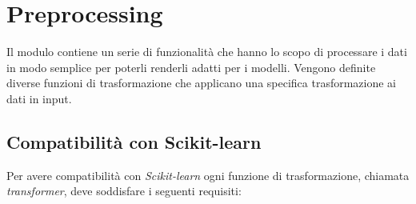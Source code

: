 \section{Preprocessing}
Il modulo contiene un serie di funzionalità che hanno lo scopo di processare i dati in modo semplice per poterli renderli adatti per i modelli. Vengono definite diverse funzioni di trasformazione che applicano una specifica trasformazione ai dati in input.

\subsection{Compatibilità con Scikit-learn}

Per avere compatibilità con \textit{Scikit-learn} ogni funzione di trasformazione, chiamata \textit{transformer}, deve soddisfare i seguenti requisiti:

